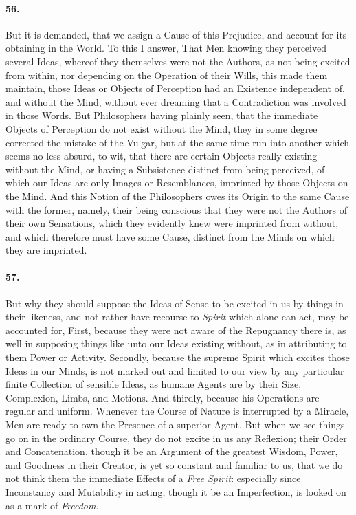 \documentclass[]{article}
\newenvironment{sectionbody}{}{}
\begin{document}
\begin{sectionbody}
\paragraph{56.} But it is demanded, that we assign a Cause of this Prejudice, and
account for its obtaining in the World.  To this I answer, That
Men knowing they perceived several Ideas, whereof they themselves
were not the Authors, as not being excited from within, nor
depending on the Operation of their Wills, this made them
maintain, those Ideas or Objects of Perception had an Existence
independent of, and without the Mind, without ever dreaming that
a Contradiction was involved in those Words.  But Philosophers
having plainly seen, that the immediate Objects of Perception do
not exist without the Mind, they in some degree corrected the
mistake of the Vulgar, but at the same time run into another
which seems no less absurd, to wit, that there are certain
Objects really existing without the Mind, or having a Subsistence
distinct from being perceived, of which our Ideas are only Images
or Resemblances, imprinted by those Objects on the Mind.  And
this Notion of the Philosophers owes its Origin to the same Cause
with the former, namely, their being conscious that they were not
the Authors of their own Sensations, which they evidently knew
were imprinted from without, and which therefore must have some
Cause, distinct from the Minds on which they are imprinted.



\paragraph{57.} But why they should suppose the Ideas of Sense to be excited in
us by things in their likeness, and not rather have recourse to
\emph{Spirit} which alone can act, may be accounted for, First,
because they were not aware of the Repugnancy there is, as well
in supposing things like unto our Ideas existing without, as in
attributing to them Power or Activity.  Secondly, because the
supreme Spirit which excites those Ideas in our Minds, is not
marked out and limited to our view by any particular finite
Collection of sensible Ideas, as humane Agents are by their Size,
Complexion, Limbs, and Motions.  And thirdly, because his
Operations are regular and uniform.  Whenever the Course of
Nature is interrupted by a Miracle, Men are ready to own the
Presence of a superior Agent.  But when we see things go on in
the ordinary Course, they do not excite in us any Reflexion;
their Order and Concatenation, though it be an Argument of the
greatest Wisdom, Power, and Goodness in their Creator, is yet so
constant and familiar to us, that we do not think them the
immediate Effects of a \emph{Free Spirit}: especially since
Inconstancy and Mutability in acting, though it be an
Imperfection, is looked on as a mark of \emph{Freedom}.




\end{sectionbody}
\end{document}
